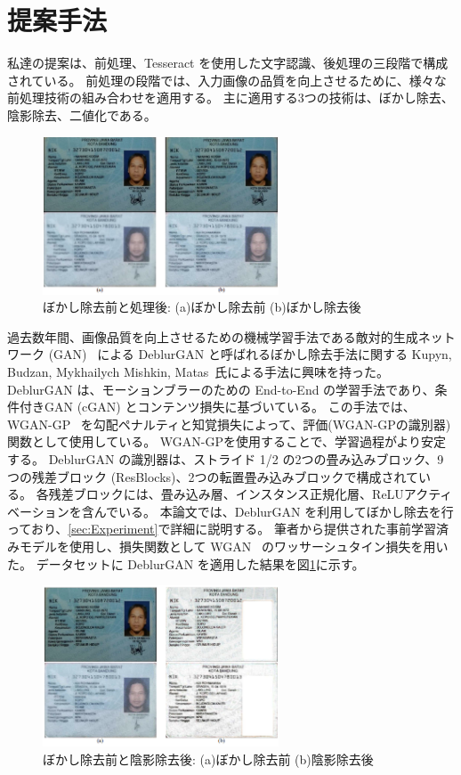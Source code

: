 \documentclass[uplatex, twocolumn,10pt]{jsarticle}
\begin{document}
\section{提案手法}

私達の提案は、前処理、Tesseract を使用した文字認識、後処理の三段階で構成されている。
前処理の段階では、入力画像の品質を向上させるために、様々な前処理技術の組み合わせを適用する。
主に適用する3つの技術は、ぼかし除去、陰影除去、二値化である。

\begin{figure}[t]
    \begin{center}
        \includegraphics*[width=7cm]{image/Figure1.png}
        \caption{ぼかし除去前と処理後: (a)ぼかし除去前 (b)ぼかし除去後}
        \label{fig:Figure1}
    \end{center}
\end{figure}

過去数年間、画像品質を向上させるための機械学習手法である敵対的生成ネットワーク (GAN)~\cite{bib8} による DeblurGAN と呼ばれるぼかし除去手法に関する Kupyn, Budzan, Mykhailych Mishkin, Matas~\cite{bib16}氏による手法に興味を持った。
DeblurGAN は、モーションブラーのための End-to-End の学習手法であり、条件付きGAN (cGAN) とコンテンツ損失に基づいている。
この手法では、WGAN-GP~\cite{bib17} を勾配ペナルティと知覚損失によって、評価(WGAN-GPの識別器)関数として使用している。
WGAN-GPを使用することで、学習過程がより安定する。
DeblurGAN の識別器は、ストライド 1/2 の2つの畳み込みブロック、9つの残差ブロック (ResBlocks)、2つの転置畳み込みブロックで構成されている。
各残差ブロックには、畳み込み層、インスタンス正規化層、ReLUアクティベーションを含んでいる。
本論文では、DeblurGAN を利用してぼかし除去を行っており、\ref{sec:Experiment}で詳細に説明する。
筆者から提供された事前学習済みモデルを使用し、損失関数として WGAN~\cite{bib17} のワッサーシュタイン損失を用いた。
データセットに DeblurGAN を適用した結果を図\ref{fig:Figure1}に示す。

\begin{figure}[t]
    \begin{center}
        \includegraphics*[width=7cm]{image/Figure2.png}
        \caption{ぼかし除去前と陰影除去後: (a)ぼかし除去前 (b)陰影除去後}
        \label{fig:Figure2}
    \end{center}
\end{figure}
\end{document}
